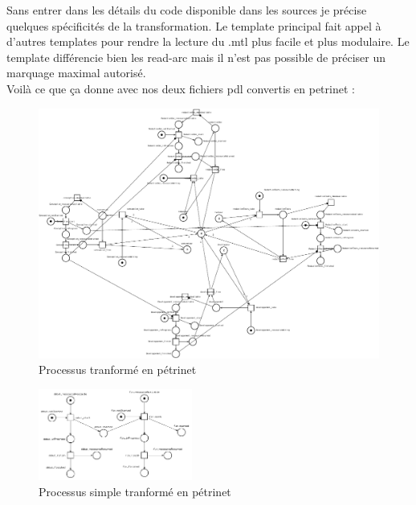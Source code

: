 Sans entrer dans les détails du code disponible dans les sources je précise quelques spécificités de la transformation.
Le template principal fait appel à d'autres templates pour rendre la lecture du .mtl plus facile et plus modulaire.
Le template différencie bien les read-arc mais il n'est pas possible de préciser un marquage maximal autorisé.\\

Voilà ce que ça donne avec nos deux fichiers pdl convertis en petrinet :

\begin{figure}[h]
\centering
\includegraphics[width=1\textwidth]{../Images/processus_net.pdf}
\caption{Processus tranformé en pétrinet}
\end{figure}

\begin{figure}[h]
\centering
\includegraphics[width=0.45\textwidth]{../Images/model_process_simple_net.png}
\caption{Processus simple tranformé en pétrinet}
\end{figure}
